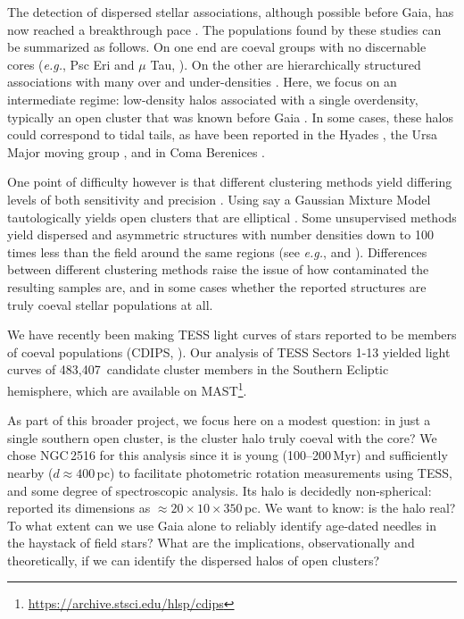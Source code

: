 \documentclass[12pt,twocolumn,tighten]{aastex63}
\newcommand{\numsouthernuniqlcs}{483{,}407\ } %
\begin{document}
The detection of dispersed stellar associations, although possible
before Gaia, has now reached a breakthrough pace \citep[{\it
e.g.},][]{bergond_gravitational_2001,zuckerman_young_2004,oh_comoving_2017,cantatgaudin_gaia_2018,gagne_banyan_XII_2018,gagne_banyan_XIII_2018,kounkel_apogee2_2018,zari_3d_2018,kounkel_untangling_2019,furnkranz_comabernbhr_2019}.
The populations found by these studies can be summarized as follows.
On one end are coeval groups with no discernable cores ({\it e.g.},
Psc Eri and $\mu$ Tau,
\citealt{meingast_psceri_2019,curtis_tess_2019,gagne_mutau_2020}).  On
the other are hierarchically structured associations with many over
and under-densities  \citep[{\it e.g.} the Sco-Cen and Vela
associations][]{pecaut_star_2016,cantatgaudin_velaOB2_2019}.  Here, we focus on
an intermediate regime: low-density halos associated with a single
overdensity, typically an open cluster that was known before Gaia
\citep[see][]{kounkel_untangling_2019,kounkel_untanglingII_2020,meingast_2021}.
In some cases, these halos could correspond to tidal tails, as have
been reported in the Hyades
\citep{meingast_hyades_2019,roser_hyades_2019}, the Ursa Major moving
group \citep{gagne_lowmassUMA_2020}, and in Coma Berenices
\citep{tang_comaber_2019}. 

One point of difficulty however is that different clustering methods
yield differing levels of both sensitivity and precision
\citep{hunt_clustering_2020}.  Using say a Gaussian Mixture Model
tautologically yields open clusters that are elliptical \citep[{\it
e.g.},][]{wallace_m4_2018}.  Some unsupervised methods yield dispersed
and asymmetric structures with number densities down to 100 times less
than the field around the same regions (see {\it e.g.},
\citealt{kounkel_untangling_2019} and \citealt{meingast_2021}).
Differences between different clustering methods raise the issue of
how contaminated the resulting samples are, and in some cases whether
the reported structures are truly coeval stellar populations at all.

We have recently been making TESS light curves of stars reported to be
members of coeval populations (CDIPS, \citealt{bouma_cdipsI_2019}).
Our analysis of TESS Sectors 1-13 yielded light curves of
\numsouthernuniqlcs candidate cluster members in the Southern Ecliptic
hemisphere, which are available on
MAST\footnote{\url{https://archive.stsci.edu/hlsp/cdips}}.

As part of this broader project, we focus here on a modest question:
in just a single southern open cluster, is the cluster halo truly
coeval with the core?  We chose NGC\,2516 for this analysis since it
is young (100--200\,Myr) and sufficiently nearby ($d\approx400$\,pc)
to facilitate photometric rotation measurements using TESS, and some
degree of spectroscopic analysis.  Its halo is decidedly
non-spherical: \citet{kounkel_untangling_2019} reported its dimensions
as $\approx20\times10\times350$\,pc.  We want to know: is the halo
real? To what extent can we use Gaia alone to reliably identify
age-dated needles in the haystack of field stars?  What are the
implications, observationally and theoretically, if we can identify
the dispersed halos of open clusters?
\end{document}
